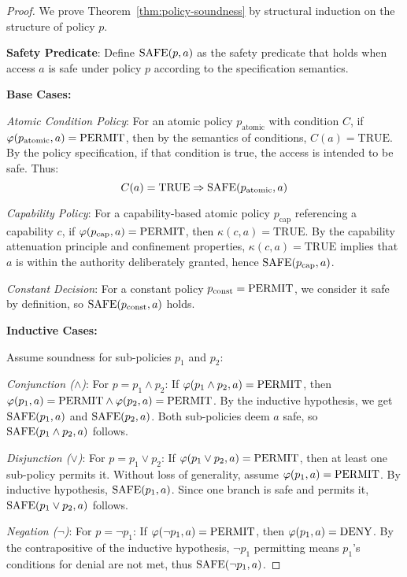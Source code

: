\begin{proof}
We prove Theorem~\ref{thm:policy-soundness} by structural induction on the structure of policy $p$.

\textbf{Safety Predicate}: Define $\text{SAFE}(p, a)$ as the safety predicate that holds when access $a$ is safe under policy $p$ according to the specification semantics.

\textbf{Base Cases:}

\emph{Atomic Condition Policy}: For an atomic policy $p_{\text{atomic}}$ with condition $C$, if $\varphi(p_{\text{atomic}}, a) = \text{PERMIT}$, then by the semantics of conditions, $C(a) = \text{TRUE}$. By the policy specification, if that condition is true, the access is intended to be safe. Thus:
\begin{equation}
C(a) = \text{TRUE} \Rightarrow \text{SAFE}(p_{\text{atomic}}, a)
\end{equation}

\emph{Capability Policy}: For a capability-based atomic policy $p_{\text{cap}}$ referencing a capability $c$, if $\varphi(p_{\text{cap}}, a) = \text{PERMIT}$, then $\kappa(c, a) = \text{TRUE}$. By the capability attenuation principle and confinement properties, $\kappa(c, a) = \text{TRUE}$ implies that $a$ is within the authority deliberately granted, hence $\text{SAFE}(p_{\text{cap}}, a)$.

\emph{Constant Decision}: For a constant policy $p_{\text{const}} = \text{PERMIT}$, we consider it safe by definition, so $\text{SAFE}(p_{\text{const}}, a)$ holds.

\textbf{Inductive Cases:}

Assume soundness for sub-policies $p_1$ and $p_2$:

\emph{Conjunction ($\land$)}: For $p = p_1 \land p_2$: If $\varphi(p_1 \land p_2, a) = \text{PERMIT}$, then $\varphi(p_1, a) = \text{PERMIT} \land \varphi(p_2, a) = \text{PERMIT}$. By the inductive hypothesis, we get $\text{SAFE}(p_1, a)$ and $\text{SAFE}(p_2, a)$. Both sub-policies deem $a$ safe, so $\text{SAFE}(p_1 \land p_2, a)$ follows.

\emph{Disjunction ($\lor$)}: For $p = p_1 \lor p_2$: If $\varphi(p_1 \lor p_2, a) = \text{PERMIT}$, then at least one sub-policy permits it. Without loss of generality, assume $\varphi(p_1, a) = \text{PERMIT}$. By inductive hypothesis, $\text{SAFE}(p_1, a)$. Since one branch is safe and permits it, $\text{SAFE}(p_1 \lor p_2, a)$ follows.

\emph{Negation ($\neg$)}: For $p = \neg p_1$: If $\varphi(\neg p_1, a) = \text{PERMIT}$, then $\varphi(p_1, a) = \text{DENY}$. By the contrapositive of the inductive hypothesis, $\neg p_1$ permitting means $p_1$'s conditions for denial are not met, thus $\text{SAFE}(\neg p_1, a)$.


\end{proof}
